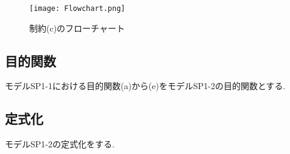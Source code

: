 \begin{figure}[H]
\begin{center}
\texttt{[image: Flowchart.png]}
\caption{制約(c)のフローチャート}
\label{picture31}
\end{center}
\end{figure}

\subsection{目的関数}
モデルSP1-1における目的関数(a)から(e)をモデルSP1-2の目的関数とする.


\clearpage

\subsection{定式化}
モデルSP1-2の定式化をする.

